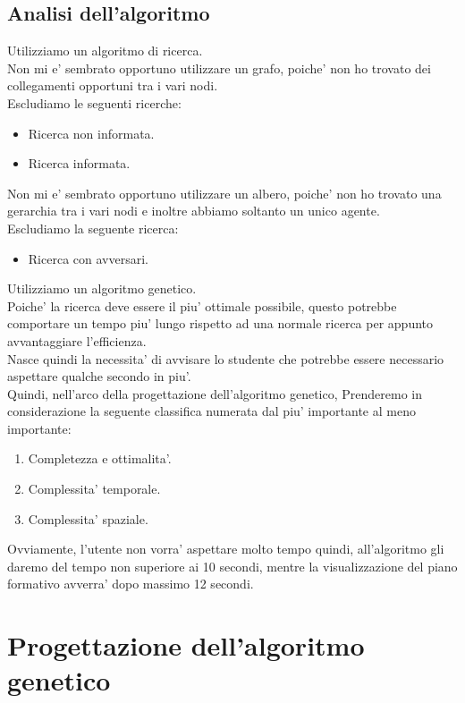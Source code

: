 \documentclass[10pt,a4paper]{article}
\begin{document}
    \subsection{Analisi dell'algoritmo}
      \label{analisiDellAlgoritmoSubsection}
      Utilizziamo un algoritmo di ricerca.\\
      Non mi e' sembrato opportuno utilizzare un grafo, poiche' non ho trovato dei collegamenti opportuni 
      tra i vari nodi.\\
      Escludiamo le seguenti ricerche:
      \begin{itemize}
        \item Ricerca non informata.
        \item Ricerca informata.
      \end{itemize}
      Non mi e' sembrato opportuno utilizzare un albero, poiche' non ho trovato una gerarchia tra i vari nodi e 
      inoltre abbiamo soltanto un unico agente.\\
      Escludiamo la seguente ricerca:
      \begin{itemize}
        \item Ricerca con avversari.
      \end{itemize}
      Utilizziamo un algoritmo genetico.\\
      Poiche' la ricerca deve essere il piu' ottimale possibile, questo 
      potrebbe comportare un tempo piu' lungo rispetto ad una normale ricerca per appunto avvantaggiare l'efficienza.\\
      Nasce quindi la necessita' di avvisare lo studente che potrebbe essere necessario aspettare qualche secondo in piu'.\\
      Quindi, nell'arco della progettazione dell'algoritmo genetico, Prenderemo in considerazione la 
      seguente classifica numerata dal piu' importante al meno importante:
      \begin{enumerate}
        \item Completezza e ottimalita'.
        \item Complessita' temporale.
        \item Complessita' spaziale.
      \end{enumerate}
      Ovviamente, l'utente non vorra' aspettare molto tempo quindi, all'algoritmo gli daremo del tempo 
      non superiore ai 10 secondi, mentre la visualizzazione del piano formativo avverra' dopo massimo 12 secondi. 
        
  \section{Progettazione dell'algoritmo genetico}
    \label{progettazioneDellAlgoritmoGeneticoSection}
    
\end{document}
